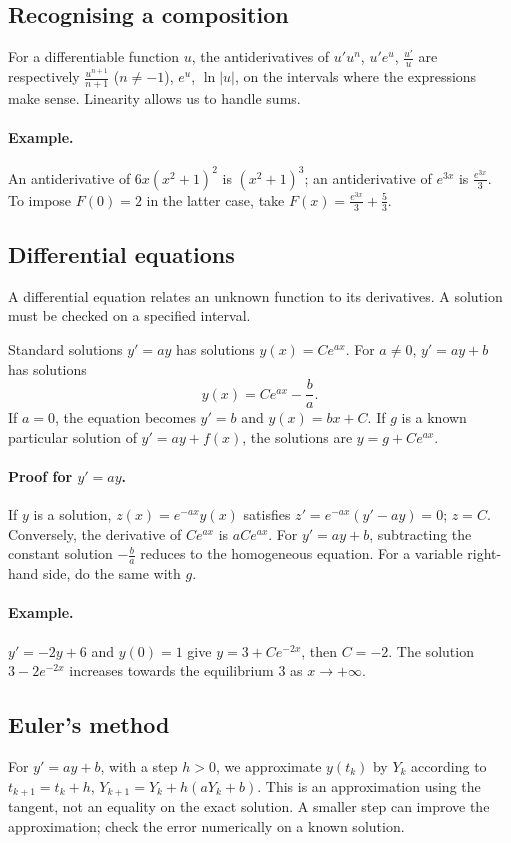\subsection{Recognising a composition}
For a differentiable function $u$, the antiderivatives of $u'u^n$, $u'e^u$, $\frac{u'}{u}$ are respectively $\frac{u^{n+1}}{n+1}$ ($n\ne-1$), $e^u$, $\ln|u|$, on the intervals where the expressions make sense. Linearity allows us to handle sums.
\paragraph{Example.} An antiderivative of $6x(x^2+1)^2$ is $(x^2+1)^3$; an antiderivative of $e^{3x}$ is $\frac{e^{3x}}{3}$. To impose $F(0)=2$ in the latter case, take $F(x)=\frac{e^{3x}}{3}+\frac{5}{3}$.
\subsection{Differential equations}
A differential equation relates an unknown function to its derivatives. A solution must be checked on a specified interval.
\begin{retenir}{Standard solutions}
$y'=ay$ has solutions $y(x)=Ce^{ax}$. For $a\ne0$, $y'=ay+b$ has solutions
\[y(x)=Ce^{ax}-\frac ba.\]
If $a=0$, the equation becomes $y'=b$ and $y(x)=bx+C$.
If $g$ is a known particular solution of $y'=ay+f(x)$, the solutions are $y=g+Ce^{ax}$.
\end{retenir}
\paragraph{Proof for $y'=ay$.} If $y$ is a solution, $z(x)=e^{-ax}y(x)$ satisfies $z'=e^{-ax}(y'-ay)=0$; $z=C$. Conversely, the derivative of $Ce^{ax}$ is $aCe^{ax}$. For $y'=ay+b$, subtracting the constant solution $-\frac{b}{a}$ reduces to the homogeneous equation. For a variable right-hand side, do the same with $g$.
\paragraph{Example.} $y'=-2y+6$ and $y(0)=1$ give $y=3+Ce^{-2x}$, then $C=-2$. The solution $3-2e^{-2x}$ increases towards the equilibrium $3$ as $x\to+\infty$.
\subsection{Euler's method}
For $y'=ay+b$, with a step $h>0$, we approximate $y(t_k)$ by $Y_k$ according to $t_{k+1}=t_k+h$, $Y_{k+1}=Y_k+h(aY_k+b)$. This is an approximation using the tangent, not an equality on the exact solution. A smaller step can improve the approximation; check the error numerically on a known solution.


